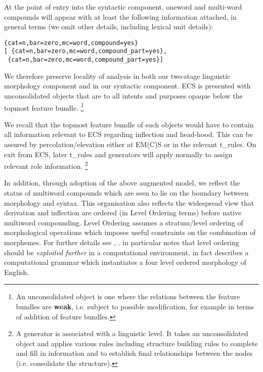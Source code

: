 At  the point of entry into the syntactic component,  oneword and 
multi-word  compounds  will  appear with at  least  the  following 
information  attached,  in general terms (we omit other  details, 
including lexical unit details):

\begin{verbatim}
{cat=n,bar=zero,mc=word,compound=yes} 
[ {cat=n,bar=zero,mc=word,compound_part=yes}, 
 {cat=n,bar=zero,mc=word,compound_part=yes}]
\end{verbatim}
 
We therefore preserve locality of analysis in both our  two-stage 
linguistic morphology component and in our syntactic component.
ECS  is presented with unconsolidated objects that  are  to 
all  intents and purposes opaque below the topmost feature bundle.
\footnote{
An unconsolidated object is one where the  relations 
between the feature bundles  are {\bf weak}, i.e. subject to possible 
modification,  for  example  in  terms  of  addition  of  feature 
bundles.}

We recall that  the  topmost feature bundle of such objects would 
have to  contain  all 
information  relevant to ECS regarding inflection and  head-hood. 
This can be assured by percolation/elevation either at EM(C)S or 
in the relevant t\_rules.   On exit from ECS,   later  t\_rules  and  
generators  will    apply  normally  to  assign  relevant   role  
information.   
\footnote{ A generator is associated with a linguistic  level. 
It  takes  an  unconsolidated object and  applies  various  rules 
including  structure  building  rules  to complete  and  fill  in 
information  and  to establish final  relationships  between  the 
nodes (i.e. consolidate the structure).}

In  addition,  through adoption of the above augmented model,  we 
reflect  the status of multiword compounds which are seen to  lie 
on the boundary between morphology and syntax.  This organisation 
also reflects the widespread view that derivation and  inflection 
are  ordered  (in  Level  Ordering  terms)  before 
native   multiword   compounding.   Level  Ordering   assumes   a
stratum/level  ordering of morphological operations which imposes 
useful constraints on the combination of morphemes.  For  further 
details  see \cite{Mohanan86}, \cite{Siegel74}. \cite{Sproat92} in 
particular   notes  that  level  ordering  should  be  {\em exploited 
further} in a computational environment. \cite{Ananiadou94} in fact 
describes a computational grammar which instantiates a four level 
ordered morphology of English.

